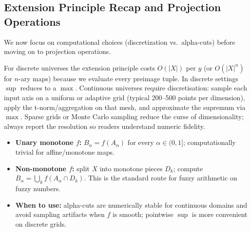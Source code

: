 \subsection{Extension Principle Recap and Projection Operations}
\label{sec:fuzzyrelations_extension_principle_recap_and_projection_operations}

We now focus on computational choices (discretization vs.\ alpha\hyp{}cuts) before moving on to projection operations.

\begin{tcolorbox}[summarybox, title={Computation and discretisation tips}]
For discrete universes the extension principle costs \(O(|X|)\) per \(y\) (or \(O(|X|^n)\) for \(n\)-ary maps) because we evaluate every preimage tuple. In discrete settings \(\sup\) reduces to a \(\max\). Continuous universes require discretisation: sample each input axis on a uniform or adaptive grid (typical 200--500 points per dimension), apply the t\hyp{}norm/aggregation on that mesh, and approximate the supremum via \(\max\). Sparse grids or Monte Carlo sampling reduce the curse of dimensionality; always report the resolution so readers understand numeric fidelity.
\end{tcolorbox}

\begin{tcolorbox}[summarybox, title={Alpha-cuts as an alternative}]
\begin{itemize}
    \item \textbf{Unary monotone \(f\):} \(B_\alpha = f(A_\alpha)\) for every \(\alpha\in(0,1]\); computationally trivial for affine/monotone maps.
    \item \textbf{Non-monotone \(f\):} split \(X\) into monotone pieces \(D_k\); compute \(B_\alpha = \bigcup_k f(A_\alpha \cap D_k)\). This is the standard route for fuzzy arithmetic on fuzzy numbers.
    \item \textbf{When to use:} alpha-cuts are numerically stable for continuous domains and avoid sampling artifacts when \(f\) is smooth; pointwise \(\sup\) is more convenient on discrete grids.
\end{itemize}
\end{tcolorbox}

